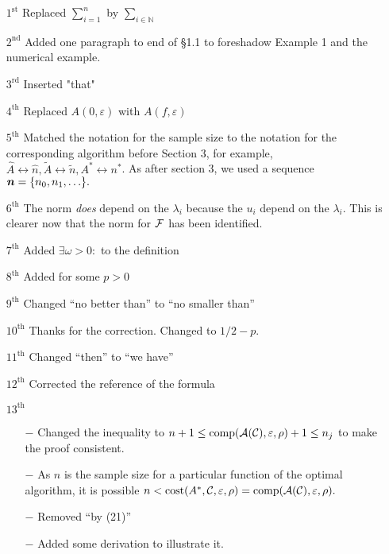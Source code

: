 \documentclass[letter]{article}
\begin{document}
\begin{enumerate}[labelwidth = 10ex]
    \item[$1^{\text{st}}$ \bullet] Replaced
    $\sum\limits_{i =1 }^n$ by $\sum\limits_{i \in \mathbb{N} }$
    \item[$2^{\text{nd}}$ \bullet] Added one paragraph to end of \S 1.1 to foreshadow Example 1 and the numerical example.
    \item[$3^{\text{rd}}$ \bullet] Inserted "that"
    \item[$4^{\text{th}}$ \bullet] Replaced $A(0,\varepsilon)$ 
    with $A(f,\varepsilon)$
    \item[$5^{\text{th}}$ \bullet] Matched the notation for the sample size to the notation for the corresponding algorithm before Section 3,  for example,
    $\widehat{A} \leftrightarrow \widehat{n}, \widetilde{A} \leftrightarrow \widetilde{n},
    A^* \leftrightarrow n^*$. As after section 3, we used a sequence ${\boldsymbol{n}} = \{n_0, n_1, \ldots \}.$ 
     \item[$6^{\text{th}}$ \bullet] The norm \emph{does} depend on the $\lambda_i$ because the $u_i$ depend on the $\lambda_i$.  This is clearer now that the norm for ${\mathcal{F}}$ has been identified.
    \item[$7^{\text{th}}$ \bullet] Added $\exists \omega >0:$ to the definition
    \item[$8^{\text{th}}$ \bullet] Added for some $p>0$
    \item[$9^{\text{th}}$ \bullet] Changed ``no better than'' to ``no smaller than''
    \item[$10^{\text{th}}$ \bullet] Thanks for the correction. Changed to $1/2 -p$.
     \item[$11^{\text{th}}$ \bullet] Changed ``then'' to ``we have''
      \item[$12^{\text{th}}$ \bullet] Corrected the reference of the formula
      \item[$13^{\text{th}}$ \bullet]
       \begin{itemize}
       \item[$-$] Changed the inequality to 
      $n + 1\le \textup{comp}({\mathcal{A}}({\mathcal{C}}),\varepsilon,\rho) +1 \le n_j$ to make the proof consistent.
      \item[$-$] As $n$ is the sample size for a particular function of the optimal algorithm, it is possible 
      $n < \textup{cost}(A^*,{\mathcal{C}},\varepsilon,\rho) =  \textup{comp}({\mathcal{A}}({\mathcal{C}}),\varepsilon,\rho).$ 
           \item[$-$] Removed ``by (21)''
           \item[$-$] Added some derivation to illustrate it.

\end{itemize}
\end{enumerate}
\end{document}
